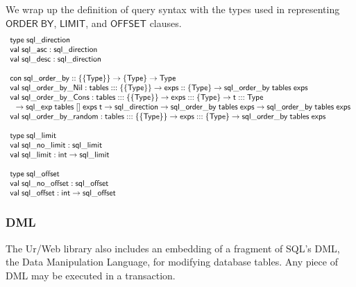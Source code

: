 \documentclass{article}
\newcommand{\mt}[1]{\mathsf{#1}}
\begin{document}
We wrap up the definition of query syntax with the types used in representing $\mt{ORDER} \; \mt{BY}$, $\mt{LIMIT}$, and $\mt{OFFSET}$ clauses.
$$\begin{array}{l}
  \mt{type} \; \mt{sql\_direction} \\
  \mt{val} \; \mt{sql\_asc} : \mt{sql\_direction} \\
  \mt{val} \; \mt{sql\_desc} : \mt{sql\_direction} \\
  \\
  \mt{con} \; \mt{sql\_order\_by} :: \{\{\mt{Type}\}\} \to \{\mt{Type}\} \to \mt{Type} \\
  \mt{val} \; \mt{sql\_order\_by\_Nil} : \mt{tables} ::: \{\{\mt{Type}\}\} \to \mt{exps} :: \{\mt{Type}\} \to \mt{sql\_order\_by} \; \mt{tables} \; \mt{exps} \\
  \mt{val} \; \mt{sql\_order\_by\_Cons} : \mt{tables} ::: \{\{\mt{Type}\}\} \to \mt{exps} ::: \{\mt{Type}\} \to \mt{t} ::: \mt{Type} \\
  \hspace{.1in} \to \mt{sql\_exp} \; \mt{tables} \; [] \; \mt{exps} \; \mt{t} \to \mt{sql\_direction} \to \mt{sql\_order\_by} \; \mt{tables} \; \mt{exps} \to \mt{sql\_order\_by} \; \mt{tables} \; \mt{exps} \\
  \mt{val} \; \mt{sql\_order\_by\_random} : \mt{tables} ::: \{\{\mt{Type}\}\} \to \mt{exps} ::: \{\mt{Type}\} \to \mt{sql\_order\_by} \; \mt{tables} \; \mt{exps} \\
  \\
  \mt{type} \; \mt{sql\_limit} \\
  \mt{val} \; \mt{sql\_no\_limit} : \mt{sql\_limit} \\
  \mt{val} \; \mt{sql\_limit} : \mt{int} \to \mt{sql\_limit} \\
  \\
  \mt{type} \; \mt{sql\_offset} \\
  \mt{val} \; \mt{sql\_no\_offset} : \mt{sql\_offset} \\
  \mt{val} \; \mt{sql\_offset} : \mt{int} \to \mt{sql\_offset}
\end{array}$$


\subsubsection{DML}

The Ur/Web library also includes an embedding of a fragment of SQL's DML, the Data Manipulation Language, for modifying database tables.  Any piece of DML may be executed in a transaction.
\end{document}
